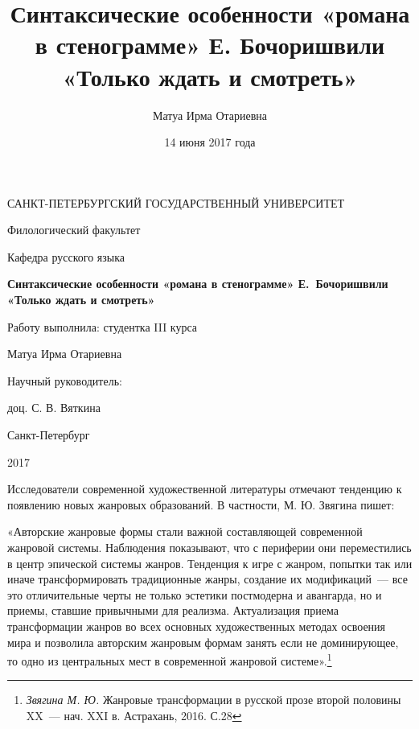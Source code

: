 \documentclass{kursa4}
\title{Синтаксические особенности «романа в стенограмме» Е. Бочоришвили «Только
ждать и смотреть»}
\author{Матуа Ирма Отариевна}
\date{14 июня 2017 года}
\begin{document}
  \begin{titlepage}

\thispagestyle{empty}

\centerline{САНКТ-ПЕТЕРБУРГСКИЙ ГОСУДАРСТВЕННЫЙ УНИВЕРСИТЕТ}
\centerline{Филологический факультет}
\centerline{Кафедра русского языка}

\vfill

\begin{center}
{\large\textbf{Синтаксические особенности «романа в стенограмме» Е.~Бочоришвили «Только ждать и смотреть»}}

\vspace{1em}

Работу выполнила: студентка III курса

{Матуа Ирма Отариевна}
\end{center}


\vfill

\hfill Научный руководитель:

\hfill доц. С. В. Вяткина

\vfill

\centerline{\small{Санкт-Петербург}} 
\centerline{\small{2017}}
\clearpage
\end{titlepage}



  \setcounter{tocdepth}{2}
  \thispagestyle{empty}
  \renewcommand\contentsname{Оглавление}
  \tableofcontents


  \setcounter{page}{3}
  \pagestyle{plain}

    Исследователи современной художественной литературы отмечают
    тенденцию к появлению новых жанровых образований. В частности, М. Ю.
    Звягина пишет:

    «Авторские жанровые формы стали важной составляющей современной
    жанровой системы. Наблюдения показывают, что с периферии они
    переместились в центр эпической системы жанров. Тенденция к игре с
    жанром, попытки так или иначе трансформировать традиционные жанры,
    создание их модификаций~--- все это отличительные черты не только
    эстетики постмодерна и авангарда, но и приемы, ставшие привычными для
    реализма. Актуализация приема трансформации жанров во всех основных
    художественных методах освоения мира и позволила авторским жанровым
    формам занять если не доминирующее, то одно из центральных мест в
    современной жанровой
    системе».\footnote{\textit{Звягина М. Ю.
    }{Жанровые трансформации в русской прозе второй
    половины XX~--- нач. XXI в. Астрахань, 2016. С.28}}
\end{document}
